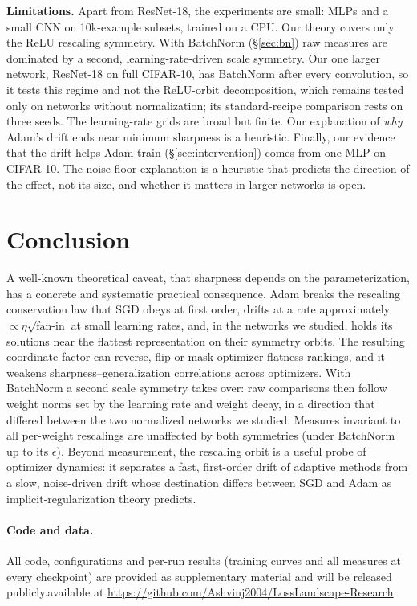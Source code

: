 \documentclass[10pt]{article}
\theoremstyle{remark}
\begin{document}
\textbf{Limitations.} Apart from ResNet-18, the experiments are small: MLPs and a small CNN on 10k-example subsets, trained on a CPU. Our theory covers only the ReLU rescaling symmetry. With BatchNorm (\S\ref{sec:bn}) raw measures are dominated by a second, learning-rate-driven scale symmetry. Our one larger network, ResNet-18 on full CIFAR-10, has BatchNorm after every convolution, so it tests this regime and not the ReLU-orbit decomposition, which remains tested only on networks without normalization; its standard-recipe comparison rests on three seeds. The learning-rate grids are broad but finite. Our explanation of \emph{why} Adam's drift ends near minimum sharpness is a heuristic. Finally, our evidence that the drift helps Adam train (\S\ref{sec:intervention}) comes from one MLP on CIFAR-10. The noise-floor explanation is a heuristic that predicts the direction of the effect, not its size, and whether it matters in larger networks is open.

\section{Conclusion}
A well-known theoretical caveat, that sharpness depends on the parameterization, has a concrete and systematic practical consequence. Adam breaks the rescaling conservation law that SGD obeys at first order, drifts at a rate approximately $\propto\eta\sqrt{\text{fan-in}}$ at small learning rates, and, in the networks we studied, holds its solutions near the flattest representation on their symmetry orbits. The resulting coordinate factor can reverse, flip or mask optimizer flatness rankings, and it weakens sharpness--generalization correlations across optimizers. With BatchNorm a second scale symmetry takes over: raw comparisons then follow weight norms set by the learning rate and weight decay, in a direction that differed between the two normalized networks we studied. Measures invariant to all per-weight rescalings are unaffected by both symmetries (under BatchNorm up to its $\epsilon$). Beyond measurement, the rescaling orbit is a useful probe of optimizer dynamics: it separates a fast, first-order drift of adaptive methods from a slow, noise-driven drift whose destination differs between SGD and Adam as implicit-regularization theory predicts.

\paragraph{Code and data.} All code, configurations and per-run results (training curves and all measures at every checkpoint) are \ifdefined\ANON provided as supplementary material and will be released publicly.\else available at \url{https://github.com/Ashvinj2004/LossLandscape-Research}.\fi
\end{document}
